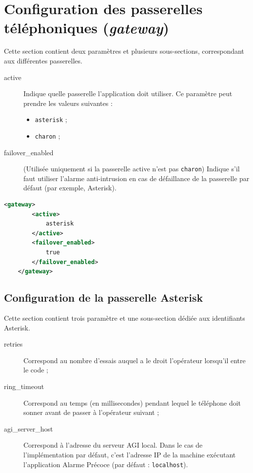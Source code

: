 \documentclass{article}
\begin{document}
\pagebreak
\section{Configuration des passerelles téléphoniques (\emph{gateway})}

Cette section contient deux paramètres et plusieurs sous-sections, correspondant aux différentes passerelles. \\

\begin{description}
    \item[active] Indique quelle passerelle l'application doit utiliser. Ce paramètre peut prendre les valeurs suivantes :
        \begin{itemize}
            \item \texttt{asterisk} ;
            \item \texttt{charon} ;
        \end{itemize}
    \item[failover\_enabled] (Utilisée uniquement si la passerelle active n'est pas \texttt{charon}) Indique s'il faut utiliser l'alarme anti-intrusion en cas de défaillance de la passerelle par défaut (par exemple, Asterisk).
\end{description}

\lstset{
    language = xml
}
\begin{lstlisting}[language=xml,name=Configuration des paramètres généraux de passerelle]
    <gateway>
        <active>
            asterisk
        </active>
        <failover_enabled>
            true
        </failover_enabled>
    </gateway>
\end{lstlisting}

\subsection{Configuration de la passerelle Asterisk}

Cette section contient trois paramètre et une sous-section dédiée aux identifiants Asterisk.

\begin{description}
    \item[retries] Correspond au nombre d'essais auquel a le droit l'opérateur lorsqu'il entre le code ;
    \item[ring\_timeout] Correspond au temps (en millisecondes) pendant lequel le téléphone doit sonner avant de passer à l'opérateur suivant ;
    \item[agi\_server\_host] Correspond à l'adresse du serveur AGI local. Dans le cas de l'implémentation par défaut, c'est l'adresse IP de la machine exécutant l'application Alarme Précoce (par défaut : \texttt{localhost}).
\end{description}
\end{document}
